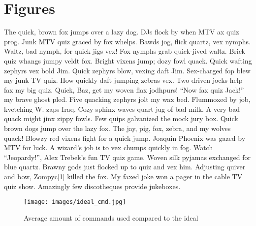 \section{Figures}
The quick, brown fox jumps over a lazy dog. DJs flock by when MTV ax quiz prog. Junk MTV quiz graced by fox whelps. Bawds jog, flick quartz, vex nymphs. Waltz, bad nymph, for quick jigs vex! Fox nymphs grab quick-jived waltz. Brick quiz whangs jumpy veldt fox. Bright vixens jump; dozy fowl quack. Quick wafting zephyrs vex bold Jim. Quick zephyrs blow, vexing daft Jim. Sex-charged fop blew my junk TV quiz. How quickly daft jumping zebras vex. Two driven jocks help fax my big quiz. Quick, Baz, get my woven flax jodhpurs! ``Now fax quiz Jack!'' my brave ghost pled. Five quacking zephyrs jolt my wax bed. Flummoxed by job, kvetching W. zaps Iraq. Cozy sphinx waves quart jug of bad milk. A very bad quack might jinx zippy fowls. Few quips galvanized the mock jury box. Quick brown dogs jump over the lazy fox. The jay, pig, fox, zebra, and my wolves quack! Blowzy red vixens fight for a quick jump. Joaquin Phoenix was gazed by MTV for luck. A wizard’s job is to vex chumps quickly in fog. Watch ``Jeopardy!'', Alex Trebek's fun TV quiz game. Woven silk pyjamas exchanged for blue quartz. Brawny gods just flocked up to quiz and vex him. Adjusting quiver and bow, Zompyc[1] killed the fox. My faxed joke won a pager in the cable TV quiz show. Amazingly few discotheques provide jukeboxes.

\begin{figure}[ht]
  \centering
  \texttt{[image: images/ideal\_cmd.jpg]}
  \caption{Average amount of commands used compared to the ideal}\label{ideal_cmd}
\end{figure}
